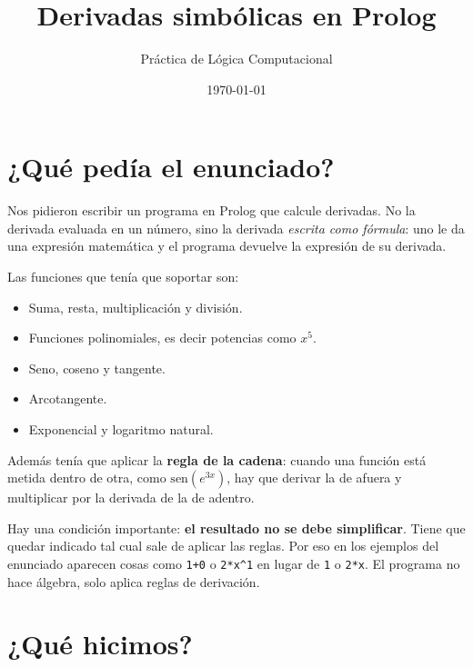 \documentclass[11pt,letterpaper]{article}
\title{\textbf{Derivadas simbólicas en Prolog}}
\author{Práctica de Lógica Computacional}
\date{\today}
\begin{document}
\maketitle

\begin{center}
\end{center}

\vspace{1em}

\section{¿Qué pedía el enunciado?}

Nos pidieron escribir un programa en Prolog que calcule derivadas. No la
derivada evaluada en un número, sino la derivada \emph{escrita como fórmula}:
uno le da una expresión matemática y el programa devuelve la expresión de su
derivada.

Las funciones que tenía que soportar son:

\begin{itemize}[noitemsep]
  \item Suma, resta, multiplicación y división.
  \item Funciones polinomiales, es decir potencias como $x^5$.
  \item Seno, coseno y tangente.
  \item Arcotangente.
  \item Exponencial y logaritmo natural.
\end{itemize}

Además tenía que aplicar la \textbf{regla de la cadena}: cuando una función
está metida dentro de otra, como $\mathrm{sen}(e^{3x})$, hay que derivar la de
afuera y multiplicar por la derivada de la de adentro.

Hay una condición importante: \textbf{el resultado no se debe simplificar}.
Tiene que quedar indicado tal cual sale de aplicar las reglas. Por eso en los
ejemplos del enunciado aparecen cosas como \texttt{1+0} o \texttt{2*x\^{}1} en
lugar de \texttt{1} o \texttt{2*x}. El programa no hace álgebra, solo aplica
reglas de derivación.

\section{¿Qué hicimos?}
\end{document}
